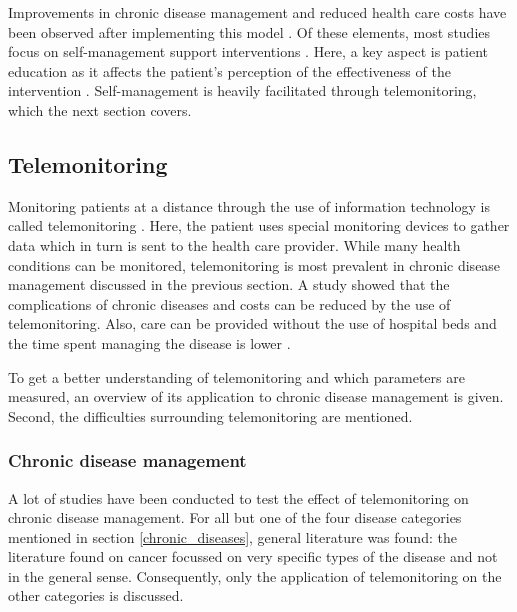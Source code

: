         \noindent Improvements in chronic disease management and reduced health care costs have been observed after implementing this model \cite{bodenheimer2002improving_2}. Of these elements, most studies focus on self-management support interventions \cite{reynolds2018systematic}.  Here, a key aspect is patient education as it affects the patient's perception of the effectiveness of the intervention \cite{wallace2010influence}. Self-management is heavily facilitated through telemonitoring, which the next section covers.

    \subsection{Telemonitoring} \label{2_telemonitoring}
    Monitoring patients at a distance through the use of information technology is called telemonitoring \cite{systematic_review}. Here, the patient uses special monitoring devices to gather data which in turn is sent to the health care provider. While many health conditions can be monitored, telemonitoring is most prevalent in chronic disease management discussed in the previous section. A study showed that the complications of chronic diseases and costs can be reduced by the use of telemonitoring. Also, care can be provided without the use of hospital beds and the time spent managing the disease is lower \cite{telemonitoring_current_state}.

    To get a better understanding of telemonitoring and which parameters are measured, an overview of its application to chronic disease management is given. Second, the difficulties surrounding telemonitoring are mentioned.

        \subsubsection{Chronic disease management}
        A lot of studies have been conducted to test the effect of telemonitoring on chronic disease management. For all but one of the four disease categories mentioned in section \ref{chronic_diseases}, general literature was found: the literature found on cancer focussed on very specific types of the disease and not in the general sense. Consequently, only the application of telemonitoring on the other categories is discussed.

